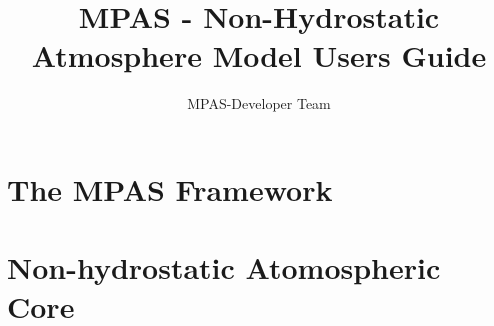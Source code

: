 \documentclass[11pt]{report}
\begin{document}
\title{MPAS - Non-Hydrostatic Atmosphere Model Users Guide}



\author{MPAS-Developer Team}

\maketitle
\tableofcontents

\part{The MPAS Framework}


%
%

\part{Non-hydrostatic Atomospheric Core}





\end{document}

